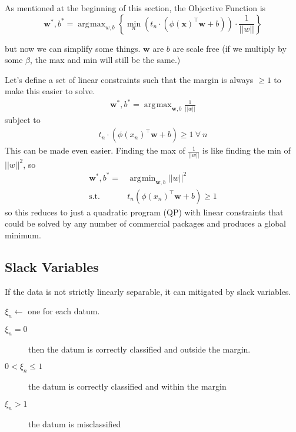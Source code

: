 \documentclass[11pt, oneside]{article}   	%
\DeclareMathOperator*{\argmin}{\arg\!\min}
\DeclareMathOperator*{\argmax}{\arg\!\max}
\begin{document}
As mentioned at the beginning of this section, the Objective Function is 
\begin{equation}
\mathbf{w}^*,b^*=
\argmax_{w,b} \left\{\min_n(t_n\cdot(\phi(\mathbf{x})^\intercal\mathbf{w}+b))\cdot\frac{1}{||w||} \right\}
\end{equation}

but now we can simplify some things. $\mathbf{w}$ are $b$ are scale free (if we multiply by some $\beta$, the max and min will still be the same.)

Let's define a set of linear constraints such that the margin is always $\ge 1$ to make this easier to solve.
\begin{align}
\mathbf{w}^*,b^*= \argmax_{\mathbf{w},b}\frac{1}{||w||}
\end{align}
subject to 
\begin{align}
t_n\cdot(\phi(x_n)^\intercal\mathbf{w}+b) \ge 1 \:\forall\: n
\end{align}
This can be made even easier. Finding the max of $\frac{1}{||w||}$ is like finding the min of $||w||^2$, so
\begin{align}
\mathbf{w}^*,b^*=& \argmin_{\mathbf{w},b}||w||^2 \\
\text{s.t.} \:& t_n(\phi(x_n)^\intercal\mathbf{w} + b) \ge 1
\end{align}
so this reduces to just a quadratic program (QP) with linear constraints that could be solved by any number of commercial packages and produces a global minimum.

\subsection{Slack Variables}
If the data is not strictly linearly separable, it can mitigated by slack variables.

$\xi_n \leftarrow$ one for each datum. 
\begin{description}
 \item[$\xi_n = 0$] then the datum is correctly classified and outside the margin.
 \item[$0 < \xi_n \le 1$] the datum is correctly classified and within the margin
 \item[$\xi_n > 1$] the datum is misclassified
\end{description}
\end{document}
